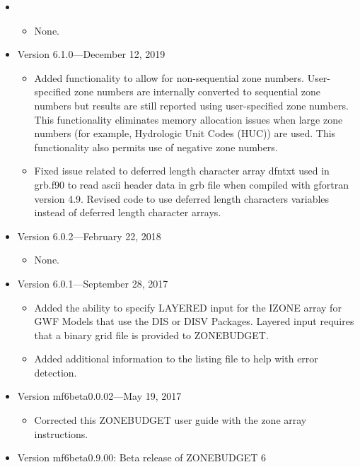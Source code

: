 \documentclass[11pt,twoside,twocolumn]{usgsreport}
\begin{document}
\begin{itemize}

\item
\currentmodflowversion
\begin{itemize}
  \item None.
\end{itemize}

\item Version 6.1.0---December 12, 2019
\begin{itemize}
  \item Added functionality to allow for non-sequential zone numbers. User-specified zone numbers are internally converted to sequential zone numbers but results are still reported using user-specified zone numbers. This functionality eliminates memory allocation issues when large zone numbers (for example, Hydrologic Unit Codes (HUC)) are used. This functionality also permits use of negative zone numbers.
  \item Fixed issue related to deferred length character array dfntxt used in grb.f90 to read ascii header data in grb file when compiled with gfortran version 4.9. Revised code to use deferred length characters variables instead of deferred length character arrays.
\end{itemize}

\item Version 6.0.2---February 22, 2018
\begin{itemize}
  \item None.
\end{itemize}

\item Version 6.0.1---September 28, 2017
\begin{itemize}
  \item Added the ability to specify LAYERED input for the IZONE array for GWF Models that use the DIS or DISV Packages.  Layered input requires that a binary grid file is provided to ZONEBUDGET.
  \item Added additional information to the listing file to help with error detection.
\end{itemize}

\item Version mf6beta0.0.02---May 19, 2017
\begin{itemize}
  \item Corrected this ZONEBUDGET user guide with the zone array instructions.
\end{itemize}

\item
Version mf6beta0.9.00:  Beta release of ZONEBUDGET 6

\end{itemize}
\end{document}

